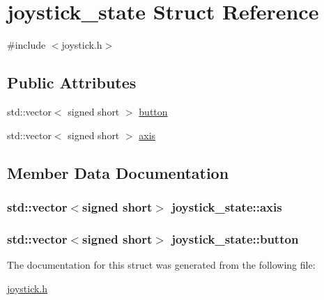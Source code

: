 \hypertarget{structjoystick__state}{}\section{joystick\+\_\+state Struct Reference}
\label{structjoystick__state}


{\ttfamily \#include $<$joystick.\+h$>$}

\subsection*{Public Attributes}
\begin{DoxyCompactItemize}
\item 
std\+::vector$<$ signed short $>$ \hyperlink{structjoystick__state_af16d0e2bea842ab4fafa05ce23f45f56}{button}
\item 
std\+::vector$<$ signed short $>$ \hyperlink{structjoystick__state_acc10718083ec5603bfcca9d1780239f2}{axis}
\end{DoxyCompactItemize}


\subsection{Member Data Documentation}
\subsubsection[{\texorpdfstring{axis}{axis}}]{\setlength{\rightskip}{0pt plus 5cm}std\+::vector$<$signed short$>$ joystick\+\_\+state\+::axis}\hypertarget{structjoystick__state_acc10718083ec5603bfcca9d1780239f2}{}\label{structjoystick__state_acc10718083ec5603bfcca9d1780239f2}
\subsubsection[{\texorpdfstring{button}{button}}]{\setlength{\rightskip}{0pt plus 5cm}std\+::vector$<$signed short$>$ joystick\+\_\+state\+::button}\hypertarget{structjoystick__state_af16d0e2bea842ab4fafa05ce23f45f56}{}\label{structjoystick__state_af16d0e2bea842ab4fafa05ce23f45f56}


The documentation for this struct was generated from the following file\+:\begin{DoxyCompactItemize}
\item 
\hyperlink{joystick_8h}{joystick.\+h}\end{DoxyCompactItemize}
